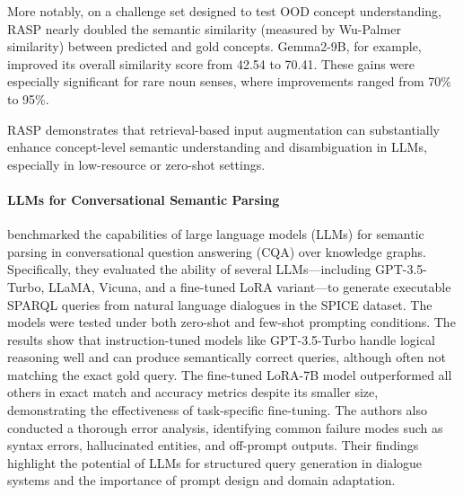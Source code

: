 More notably, on a challenge set designed to test OOD concept understanding, RASP nearly doubled the semantic similarity (measured by Wu-Palmer similarity) between predicted and gold concepts. Gemma2-9B, for example, improved its overall similarity score from 42.54 to 70.41. These gains were especially significant for rare noun senses, where improvements ranged from 70\% to 95\%.

RASP demonstrates that retrieval-based input augmentation can substantially enhance concept-level semantic understanding and disambiguation in LLMs, especially in low-resource or zero-shot settings.

\paragraph{LLMs for Conversational Semantic Parsing}

\cite{semler2023llmsp} benchmarked the capabilities of large language models (LLMs) for semantic parsing in conversational question answering (CQA) over knowledge graphs. Specifically, they evaluated the ability of several LLMs—including GPT-3.5-Turbo, LLaMA, Vicuna, and a fine-tuned LoRA variant—to generate executable SPARQL queries from natural language dialogues in the SPICE dataset. The models were tested under both zero-shot and few-shot prompting conditions. The results show that instruction-tuned models like GPT-3.5-Turbo handle logical reasoning well and can produce semantically correct queries, although often not matching the exact gold query. The fine-tuned LoRA-7B model outperformed all others in exact match and accuracy metrics despite its smaller size, demonstrating the effectiveness of task-specific fine-tuning. The authors also conducted a thorough error analysis, identifying common failure modes such as syntax errors, hallucinated entities, and off-prompt outputs. Their findings highlight the potential of LLMs for structured query generation in dialogue systems and the importance of prompt design and domain adaptation.

